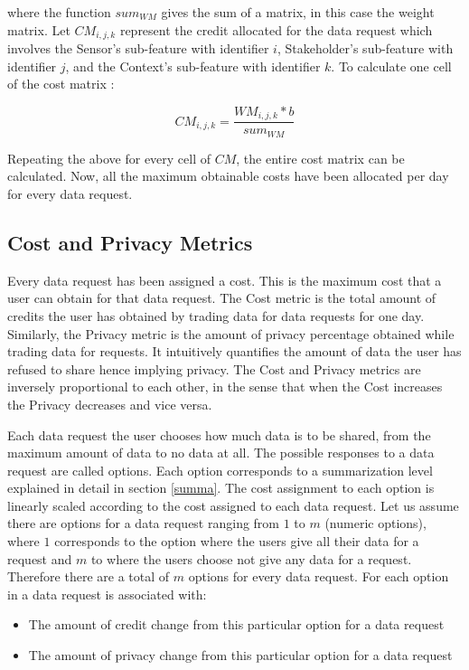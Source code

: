 where the function $sum_{WM}$ gives the sum of a matrix, in this case the weight matrix.
Let $CM_{i,j,k}$ represent the credit allocated for the data request which involves the Sensor's sub-feature with identifier $i$, Stakeholder's sub-feature with identifier $j$, and the Context's sub-feature with identifier $k$. To calculate one cell of the cost matrix :

\begin{equation}
CM_{i,j,k} = \frac{WM_{i,j,k} * b}{sum_{WM}}
\end{equation}

Repeating the above for every cell of $CM$, the entire cost matrix can be calculated. Now, all the maximum obtainable costs have been allocated per day for every data request.

\subsection{Cost and Privacy Metrics}
Every data request has been assigned a cost. This is the maximum cost that a user can obtain for that data request.
The Cost metric is the total amount of credits the user has obtained by trading data for data requests for one day. Similarly, the Privacy metric is the amount of privacy percentage obtained while trading data for requests. It intuitively quantifies the amount of data the user has refused to share hence implying privacy. The Cost and Privacy metrics are inversely proportional to each other, in the sense that when the Cost increases the Privacy decreases and vice versa.

Each data request the user chooses how much data is to be shared, from the maximum amount of data to no data at all. The possible responses to a data request are called options. Each option corresponds to a summarization level explained in detail in section \ref{summa}. The cost assignment to each option is linearly scaled according
to the cost assigned to each data request. Let us assume there are options for a data request ranging from $1$ to $m$ (numeric options), where $1$ corresponds to the option where the users give all their data for a request and $m$ to where the users choose not give any data for a request. Therefore there are a total of $m$ options for every data request. For each option in a data request is associated with:

\begin{itemize}
\item The amount of credit change from this particular option for a data request
\item The amount of privacy change from this particular option for a data request
\end{itemize}

